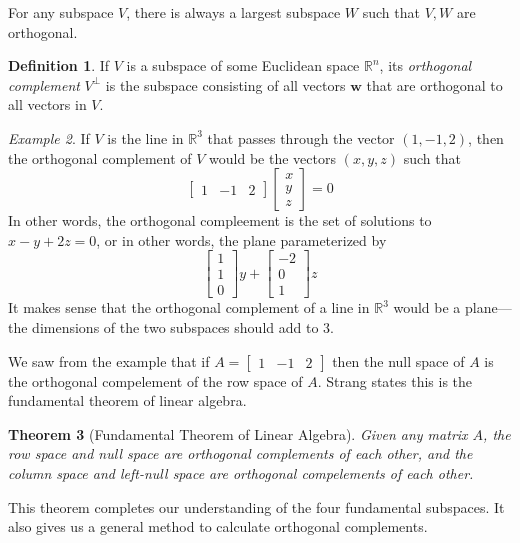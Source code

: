 \documentclass[11pt,oneside]{amsbook}
\newcommand{\R}{\mathbb R}
\theoremstyle{definition}
\theoremstyle{plain}
\newtheorem{theorem}{Theorem}[section]
\theoremstyle{definition}
\newtheorem{definition}[theorem]{Definition}
\theoremstyle{remark}
\newtheorem{example}[theorem]{Example}
\numberwithin{equation}{section}
\numberwithin{figure}{section}
\begin{document}
For any subspace $V$, there is always a largest subspace $W$ such that $V,W$ are orthogonal.

\begin{definition}
  If $V$ is a subspace of some Euclidean space $\R^n$, its \emph{orthogonal complement} $V^\perp$ is the subspace consisting of all vectors $\mathbf{w}$ that are orthogonal to all vectors in $V$.
\end{definition}

\begin{example}
  If $V$ is the line in $\R^3$ that passes through the vector $(1,-1,2)$, then the orthogonal complement of $V$ would be the vectors $(x,y,z)$ such that
  \[\begin{bmatrix}1&-1&2\end{bmatrix}
    \begin{bmatrix}x\\y\\z\end{bmatrix}=0
  \]
  In other words, the orthogonal compleement is the set of solutions to $x-y+2z=0$, or in other words, the plane parameterized by
  \[\begin{bmatrix}1\\1\\0\end{bmatrix}y
    +\begin{bmatrix}-2\\0\\1\end{bmatrix}z
  \]
  It makes sense that the orthogonal complement of a line in $\R^3$ would be a plane---the dimensions of the two subspaces should add to $3$.
\end{example}

We saw from the example that if $A=\begin{bmatrix}1&-1&2\end{bmatrix}$ then the null space of $A$ is the orthogonal compelement of the row space of $A$. Strang states this is the fundamental theorem of linear algebra.

\begin{theorem}[Fundamental Theorem of Linear Algebra]
  Given any matrix $A$, the row space and null space are orthogonal complements of each other, and the column space and left-null space are orthogonal compelements of each other.
\end{theorem}

This theorem completes our understanding of the four fundamental subspaces. It also gives us a general method to calculate orthogonal complements.
\end{document}
